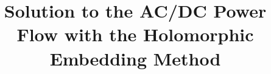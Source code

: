 \documentclass[conference]{IEEEtran}
\begin{document}
%
\title{Solution to the AC/DC Power Flow with the Holomorphic Embedding Method}


\author{
}



% 








\maketitle
\end{document}
